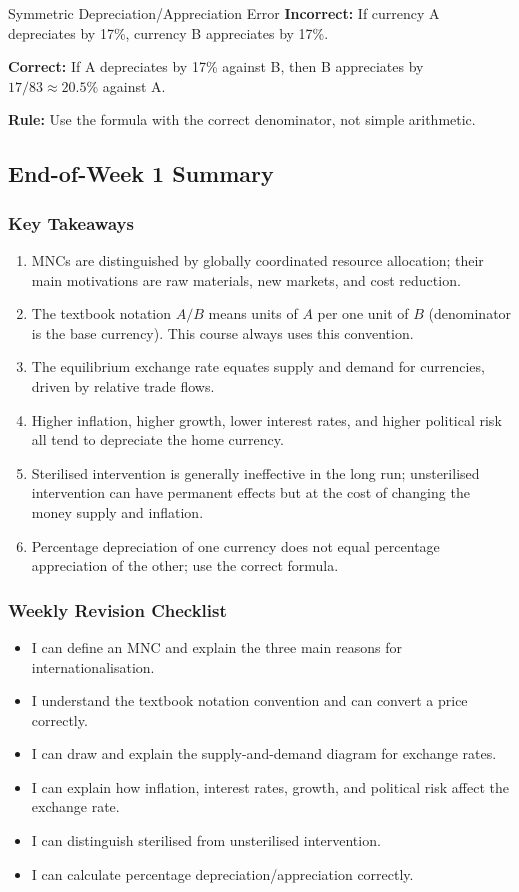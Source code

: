 \documentclass[11pt,a4paper]{article}
\newcommand{\cb}{\(\square\)\enspace}
\begin{document}
\begin{mistakebox}{Symmetric Depreciation/Appreciation Error}
\textbf{Incorrect:} If currency A depreciates by 17\%, currency B appreciates by 17\%.

\textbf{Correct:} If A depreciates by 17\% against B, then B appreciates by $17/83 \approx 20.5\%$ against A.

\textbf{Rule:} Use the formula with the correct denominator, not simple arithmetic.
\end{mistakebox}

\subsection{End-of-Week 1 Summary}

\subsubsection*{Key Takeaways}
\begin{enumerate}
  \item MNCs are distinguished by globally coordinated resource allocation; their main motivations are raw materials, new markets, and cost reduction.
  \item The textbook notation $A/B$ means units of $A$ per one unit of $B$ (denominator is the base currency). This course always uses this convention.
  \item The equilibrium exchange rate equates supply and demand for currencies, driven by relative trade flows.
  \item Higher inflation, higher growth, lower interest rates, and higher political risk all tend to depreciate the home currency.
  \item Sterilised intervention is generally ineffective in the long run; unsterilised intervention can have permanent effects but at the cost of changing the money supply and inflation.
  \item Percentage depreciation of one currency does not equal percentage appreciation of the other; use the correct formula.
\end{enumerate}

\subsubsection*{Weekly Revision Checklist}
\begin{itemize}[leftmargin=2em]
  \item[\cb] I can define an MNC and explain the three main reasons for internationalisation.
  \item[\cb] I understand the textbook notation convention and can convert a price correctly.
  \item[\cb] I can draw and explain the supply-and-demand diagram for exchange rates.
  \item[\cb] I can explain how inflation, interest rates, growth, and political risk affect the exchange rate.
  \item[\cb] I can distinguish sterilised from unsterilised intervention.
  \item[\cb] I can calculate percentage depreciation/appreciation correctly.
\end{itemize}
\end{document}

